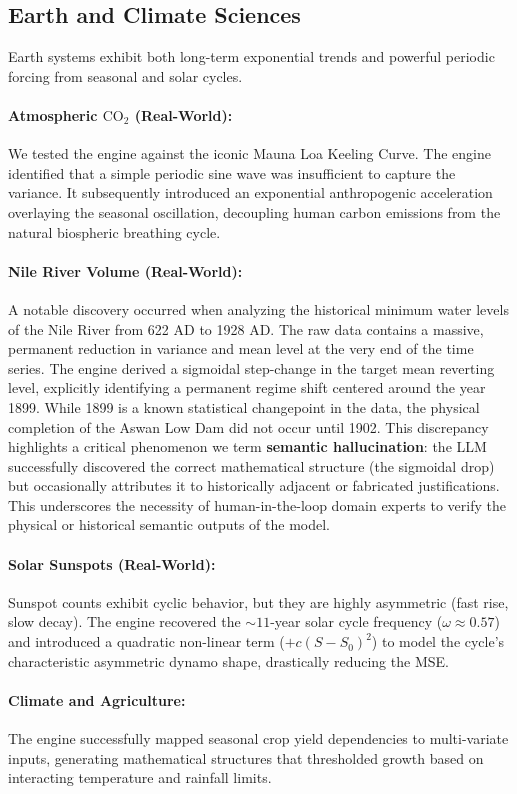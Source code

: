\subsection{Earth and Climate Sciences}

Earth systems exhibit both long-term exponential trends and powerful periodic forcing from seasonal and solar cycles.

\paragraph{Atmospheric $\text{CO}_2$ (Real-World):} We tested the engine against the iconic Mauna Loa Keeling Curve. The engine identified that a simple periodic sine wave was insufficient to capture the variance. It subsequently introduced an exponential anthropogenic acceleration overlaying the seasonal oscillation, decoupling human carbon emissions from the natural biospheric breathing cycle.
\paragraph{Nile River Volume (Real-World):} A notable discovery occurred when analyzing the historical minimum water levels of the Nile River from 622 AD to 1928 AD. The raw data contains a massive, permanent reduction in variance and mean level at the very end of the time series. The engine derived a sigmoidal step-change in the target mean reverting level, explicitly identifying a permanent regime shift centered around the year 1899. While 1899 is a known statistical changepoint in the data, the physical completion of the Aswan Low Dam did not occur until 1902. This discrepancy highlights a critical phenomenon we term \textbf{semantic hallucination}: the LLM successfully discovered the correct mathematical structure (the sigmoidal drop) but occasionally attributes it to historically adjacent or fabricated justifications. This underscores the necessity of human-in-the-loop domain experts to verify the physical or historical semantic outputs of the model.
\paragraph{Solar Sunspots (Real-World):} Sunspot counts exhibit cyclic behavior, but they are highly asymmetric (fast rise, slow decay). The engine recovered the $\sim 11$-year solar cycle frequency ($\omega \approx 0.57$) and introduced a quadratic non-linear term ($+c(S-S_0)^2$) to model the cycle's characteristic asymmetric dynamo shape, drastically reducing the MSE.
\paragraph{Climate and Agriculture:} The engine successfully mapped seasonal crop yield dependencies to multi-variate inputs, generating mathematical structures that thresholded growth based on interacting temperature and rainfall limits.
